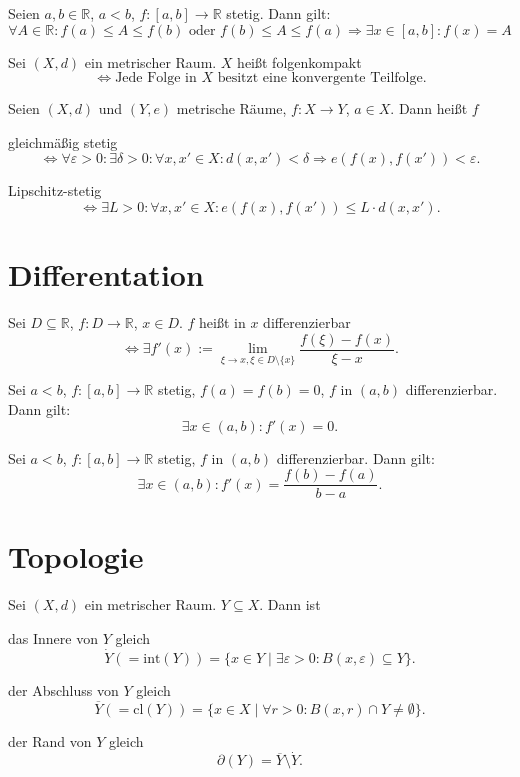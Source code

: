 \documentclass[]{scrartcl}
\newcommand{\R}{\ensuremath{\mathbb{R}}}
\begin{document}
\begin{satz}[Zwischenwertsatz]
Seien $a,b\in\R$, $a<b$, $f\colon \left[a,b\right]\to\R$ stetig. Dann gilt:
\[\forall A\in\R\colon f(a)\leq A\leq f(b)\text{ oder } f(b)\leq A\leq f(a) \Rightarrow \exists x\in\left[a,b\right]\colon f(x)=A\]
\end{satz}

\begin{definition}[Folgenkompakt]
Sei $(X,d)$ ein metrischer Raum. $X$ hei\ss t folgenkompakt
\[\Leftrightarrow\text{Jede Folge in $X$ besitzt eine konvergente Teilfolge.}\]
\end{definition}

\begin{definition}
Seien $(X,d)$ und $(Y,e)$ metrische R\"aume, $f\colon X\to Y$, $a\in X$. Dann hei\ss t $f$

gleichm\"a\ss ig stetig
\[\Leftrightarrow\forall\varepsilon>0\colon \exists\delta>0\colon \forall x,x'\in X\colon d(x,x')<\delta\Rightarrow e(f(x),f(x'))<\varepsilon.\]

Lipschitz-stetig
\[\Leftrightarrow\exists L>0\colon \forall x,x'\in X\colon e(f(x),f(x'))\leq L\cdot d(x,x').\]
\end{definition}

\section*{Differentation}
\begin{definition}[Differenzierbar]
Sei $D\subseteq\R$, $f\colon D\to\R$, $x\in D$. $f$ hei\ss t in $x$ differenzierbar
\[\Leftrightarrow\exists f'(x):=\lim\limits_{\xi\to x,\xi\in D\setminus\{x\}}\frac{f(\xi)-f(x)}{\xi-x}.\]
\end{definition}

\begin{satz}
Sei $a<b$, $f\colon \left[a,b\right]\to\R$ stetig, $f(a)=f(b)=0$, $f$ in $(a,b)$ differenzierbar. Dann gilt:
\[\exists x\in(a,b)\colon f'(x)=0.\]
\end{satz}

\begin{satz}[Mittelwertsatz]
Sei $a<b$, $f\colon \left[a,b\right]\to\R$ stetig, $f$ in $(a,b)$ differenzierbar. Dann gilt:
\[\exists x\in(a,b)\colon f'(x)=\frac{f(b)-f(a)}{b-a}.\]
\end{satz}

\section*{Topologie}
\begin{definition}
Sei $(X,d)$ ein metrischer Raum. $Y\subseteq X$. Dann ist

das Innere von $Y$ gleich
\[\dot{Y}(=\text{int}(Y))=\{x\in Y\mid \exists\varepsilon>0\colon B(x,\varepsilon)\subseteq Y\}.\]

der Abschluss von $Y$ gleich
\[\overline{Y}(=\text{cl}(Y))=\{x\in X\mid \forall r>0\colon B(x,r)\cap Y\neq\emptyset\}.\]

der Rand von $Y$ gleich
\[\partial(Y)=\overline{Y}\setminus\dot{Y}.\]
\end{definition}
\end{document}
